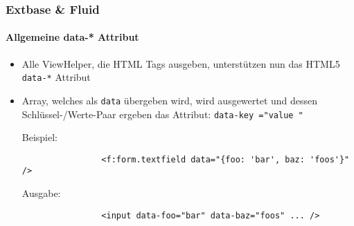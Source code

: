 \begin{frame}[fragile]
	\frametitle{Extbase \& Fluid}
	\framesubtitle{Allgemeine data-* Attribut}

	\begin{itemize}
		\item Alle ViewHelper, die HTML Tags ausgeben, unterstützen nun das HTML5 \texttt{data-*} Attribut

		\item Array, welches als \texttt{data} übergeben wird, wird ausgewertet und dessen
			Schlüssel-/Werte-Paar ergeben das Attribut:
			\texttt{data-\begingroup\color{typo3orange}key\endgroup
				="\begingroup\color{typo3orange}value\endgroup
				"}\newline

			Beispiel:
			\begin{lstlisting}
				<f:form.textfield data="{foo: 'bar', baz: 'foos'}" />
			\end{lstlisting}

			Ausgabe:
			\begin{lstlisting}
				<input data-foo="bar" data-baz="foos" ... />
			\end{lstlisting}

	\end{itemize}

\end{frame}


